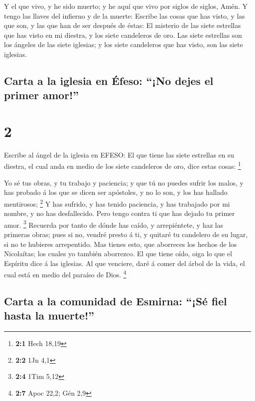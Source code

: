  Y el que vivo, y he sido muerto; y he aquí que vivo por
siglos de siglos, Amén. Y tengo las llaves del infierno y de la muerte:
 Escribe las cosas que has visto, y las que son, y las
que han de ser después de éstas:  El misterio de las
siete estrellas que has visto en mi diestra, y los siete candeleros de
oro. Las siete estrellas son los ángeles de las siete iglesias; y los
siete candeleros que has visto, son las siete iglesias.

\hypertarget{carta-a-la-iglesia-en-uxe9feso-no-dejes-el-primer-amor}{%
\subsection{Carta a la iglesia en Éfeso: ``¡No dejes el primer
amor!''}\label{carta-a-la-iglesia-en-uxe9feso-no-dejes-el-primer-amor}}

\hypertarget{section-1}{%
\section{2}\label{section-1}}

 Escribe al ángel de la iglesia en EFESO: El que tiene las
siete estrellas en su diestra, el cual anda en medio de los siete
candeleros de oro, dice estas cosas: \footnote{\textbf{2:1} Hech 18,19}

 Yo sé tus obras, y tu trabajo y paciencia; y que tú no
puedes sufrir los malos, y has probado á los que se dicen ser apóstoles,
y no lo son, y los has hallado mentirosos; \footnote{\textbf{2:2} 1Jn
  4,1}  Y has sufrido, y has tenido paciencia, y has
trabajado por mi nombre, y no has desfallecido.  Pero
tengo contra ti que has dejado tu primer amor. \footnote{\textbf{2:4}
  1Tim 5,12}  Recuerda por tanto de dónde has caído, y
arrepiéntete, y haz las primeras obras; pues si no, vendré presto á ti,
y quitaré tu candelero de su lugar, si no te hubieres arrepentido.
 Mas tienes esto, que aborreces los hechos de los
Nicolaítas; los cuales yo también aborrezco.  El que tiene
oído, oiga lo que el Espíritu dice á las iglesias. Al que venciere, daré
á comer del árbol de la vida, el cual está en medio del paraíso de Dios.
\footnote{\textbf{2:7} Apoc 22,2; Gén 2,9}

\hypertarget{carta-a-la-comunidad-de-esmirna-suxe9-fiel-hasta-la-muerte}{%
\subsection{Carta a la comunidad de Esmirna: ``¡Sé fiel hasta la
muerte!''}\label{carta-a-la-comunidad-de-esmirna-suxe9-fiel-hasta-la-muerte}}

